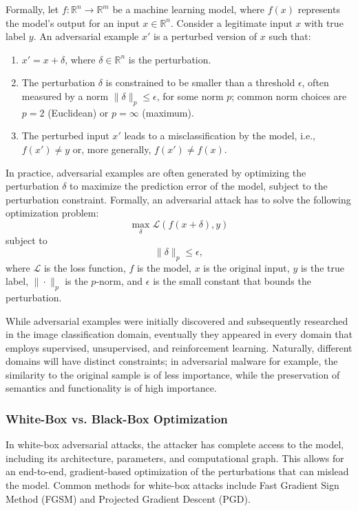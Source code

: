 Formally, let \( f: \mathbb{R}^n \to \mathbb{R}^m \) be a machine learning model, where \( f(x) \) represents the model's output for an input \( x \in \mathbb{R}^n \). Consider a legitimate input \( x \) with true label \( y \). An adversarial example \( x' \) is a perturbed version of \( x \) such that:

\begin{enumerate}
    \item \( x' = x + \delta \), where \( \delta \in \mathbb{R}^n \) is the perturbation. 
    \item The perturbation \( \delta \) is constrained to be smaller than a threshold \(\epsilon\), often measured by a norm \( \|\delta\|_p \leq \epsilon\), for some norm \( p \); common norm choices are \( p = 2 \) (Euclidean) or \( p = \infty \) (maximum).
    \item The perturbed input \( x' \) leads to a misclassification by the model, i.e., \( f(x') \neq y \) or, more generally, \( f(x') \neq f(x) \).
\end{enumerate}

In practice, adversarial examples are often generated by optimizing the perturbation \( \delta \) to maximize the prediction error of the model, subject to the perturbation constraint.
Formally, an adversarial attack has to solve the following optimization problem:
\[
\max_{\delta} \mathcal{L}(f(x + \delta), y)
\]
subject to
\[
\|\delta\|_p \leq \epsilon,
\]
where $\mathcal{L}$ is the loss function, $f$ is the model, $x$ is the original input, $y$ is the true label, $\|\cdot\|_p$ is the $p$-norm, and $\epsilon$ is the small constant that bounds the perturbation.

While adversarial examples were initially discovered and subsequently researched in the image classification domain, eventually they appeared in every domain that employs supervised, unsupervised, and reinforcement learning.
Naturally, different domains will have distinct constraints; in adversarial malware for example, the similarity to the original sample is of less importance, while the preservation of semantics and functionality is of high importance. 

\subsubsection{White-Box vs. Black-Box Optimization}

In white-box adversarial attacks, the attacker has complete access to the model, including its architecture, parameters, and computational graph.
This allows for an end-to-end, gradient-based optimization of the perturbations that can mislead the model.
Common methods for white-box attacks include Fast Gradient Sign Method (\gls{FGSM}) and Projected Gradient Descent (\gls{PGD}).

